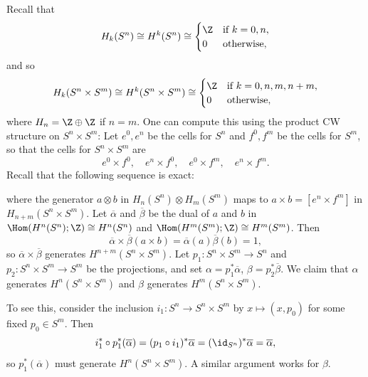 \begin{example}
  Recall that
  \[
    H_k(S^n) \cong H^k(S^n) \cong
    \begin{cases}
      \Z & \text{if } k = 0, n, \\
      0 & \text{otherwise},
    \end{cases}
  \]
  and so
  \[
    H_k(S^n \times S^m) \cong
    H^k(S^n \times S^m) \cong
    \begin{cases}
      \Z & \text{if } k = 0, n, m, n + m, \\
      0 & \text{otherwise},
    \end{cases}
  \]
  where $H_n = \Z \oplus \Z$ if $n = m$.
  One can compute this using the product
  CW structure on $S^n \times S^m$: Let
  $e^0, e^n$ be the cells for $S^n$ and
  $f^0, f^m$ be the cells for $S^m$, so
  that the cells for $S^n \times S^m$ are
  \[
    e^0 \times f^0, \quad e^n \times f^0,
    \quad e^0 \times f^m, \quad e^n \times f^m.
  \]
  Recall that the following sequence is exact:
  \begin{center}
  \end{center}
  where the generator $a \otimes b$ in $H_n(S^n) \otimes H_m(S^m)$ maps to
  $a \times b = [e^n \times f^m]$ in $H_{n + m}(S^n \times S^m)$.
  Let $\overline{\alpha}$ and $\overline{\beta}$ be the dual of $a$ and $b$ in
  $\Hom(H^n(S^n); \Z) \cong H^n(S^n)$ and
  $\Hom(H^m(S^m); \Z) \cong H^m(S^m)$. Then
  \[
    \overline{\alpha} \times \overline{\beta}(a \times b) = \overline{\alpha}(a) \overline{\beta}(b) = 1,
  \]
  so $\overline{\alpha} \times \overline{\beta}$
  generates $H^{n + m}(S^n \times S^m)$.
  Let $p_1 : S^n \times S^m \to S^n$
  and $p_2 : S^n \times S^m \to S^m$ be
  the projections, and set
  $\alpha = p_1^* \overline{\alpha}$,
  $\beta = p_2^* \overline{\beta}$.
  We claim that $\alpha$ generates
  $H^n(S^n \times S^m)$ and $\beta$ generates
  $H^m(S^n \times S^m)$.

  To see this, consider the inclusion $i_1 : S^n \to S^n \times S^m$
  by $x \mapsto (x, p_0)$ for some fixed
  $p_0 \in S^m$. Then
  \[
    i_1^* \circ p_1^* (\overline{\alpha})
    = (p_1 \circ i_1)^* \overline{\alpha}
    = (\id_{S^n})^* \overline{\alpha}
    = \overline{\alpha},
  \]
  so $p_1^*(\overline{\alpha})$ must
  generate $H^n(S^n \times S^m)$. A similar
  argument works for $\beta$.


\end{example}

